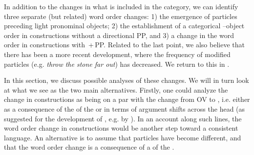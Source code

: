 \documentclass[output=paper]{langscibook}
\begin{document}
In addition to the changes in what is included in the  category, we can identify three separate (but related) word order changes: 1) the emergence of particles preceding light pronominal objects; 2) the establishment of a categorical –object order in constructions without a directional PP, and 3) a change in the word order in constructions with \,+\,PP. Related to the last point, we also believe that there has been a more recent development, where the frequency of modified particles (e.g. \textit{throw the stone far out}) has decreased. We return to this in .



In this section, we discuss possible analyses of these changes. We will in turn look at what we see as the two main alternatives. Firstly, one could analyze the change in  constructions as being on a par with the change from OV to , i.e. either as a consequence of the  of the  or in terms of argument shifts across the  head (as suggested for the development of , e.g. by \citealt{Petzell2011}). In an account along such lines, the word order change in  constructions would be another step toward a consistent  language. An alternative is to assume that  particles have become different, and that the word order change is a consequence of a  of the . 
\end{document}
